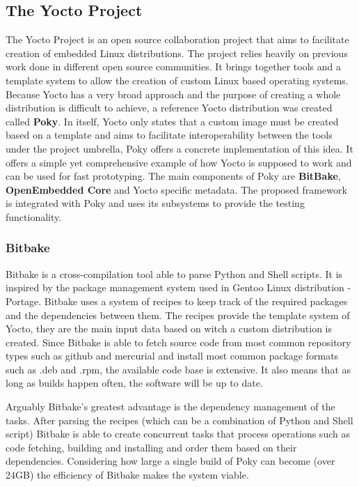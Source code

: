 \subsection{The Yocto Project}
The Yocto Project is an open source collaboration project that aims to facilitate creation of embedded Linux distributions. The project relies heavily on previous work done in different open source communities. It brings together tools and a template system to allow the creation of custom Linux based operating systems. Because Yocto has a very broad approach and the purpose of creating a whole distribution is difficult to achieve, a reference Yocto distribution was created called \textbf{Poky}. In itself, Yocto only states that a custom image must be created based on a template and aims to facilitate interoperability between the tools under the project umbrella, Poky offers a concrete implementation of this idea. It offers a simple yet comprehensive example of how Yocto is supposed to work and can be used for fast prototyping. The main components of Poky are \textbf{BitBake}, \textbf{OpenEmbedded Core} and Yocto specific metadata. The proposed framework is integrated with Poky and uses its subsystems to provide the testing functionality.

\subsubsection*{Bitbake}
Bitbake is a cross-compilation tool able to parse Python and Shell scripts. It is inspired by the package management system used in Gentoo Linux distribution - Portage. Bitbake uses a system of recipes to keep track of the required packages and the dependencies between them. The recipes provide the template system of Yocto, they are the main input data based on witch a custom distribution is created. Since Bitbake is able to fetch source code from most common repository types such as github and mercurial and install most common package formats such as .deb and .rpm, the available code base is extensive. It also means that as long as builds happen often, the software will be up to date.

Arguably Bitbake's greatest advantage is the dependency management of the tasks. After parsing the recipes (which can be a combination of Python and Shell script) Bitbake is able to create concurrent tasks that process operations such as code fetching, building and installing and order them based on their dependencies. Considering how large a single build of Poky can become (over 24GB) the efficiency of Bitbake makes the system viable.

